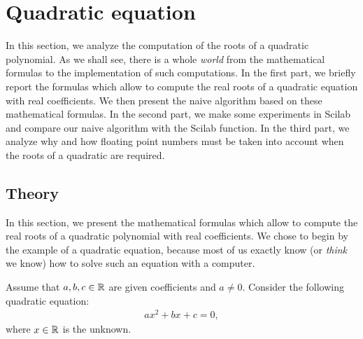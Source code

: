%

\section{Quadratic equation}

In this section, we analyze the computation of the roots of a quadratic polynomial.
As we shall see, there is a whole \emph{world} from the mathematical formulas to the 
implementation of such computations. In the first part, we briefly report the formulas which allow to 
compute the real roots of a quadratic equation with real coefficients.
We then present the naive algorithm based on these mathematical formulas. 
In the second part, we make some experiments in Scilab and compare our
naive algorithm with the  Scilab function.
In the third part, we analyze why and how floating point numbers must be 
taken into account when the roots of a quadratic are required.

\subsection{Theory}

In this section, we present the mathematical formulas which allow to compute the 
real roots of a quadratic polynomial with real coefficients.
We chose to begin by the example of a quadratic equation, because most of 
us exactly know (or \emph{think} we know) how to solve such an equation with a computer.

Assume that $a, b, c \in \mathbb{R}$ are given coefficients and $a\neq 0$. 
Consider the following quadratic \cite{wikipediaquadratic,wikipedialossofsign,mathworldquadratic} equation:
\begin{eqnarray}
\label{eq-quadratic}
a x^2 + b x + c = 0,
\end{eqnarray}
where $x\in\mathbb{R}$ is the unknown.

